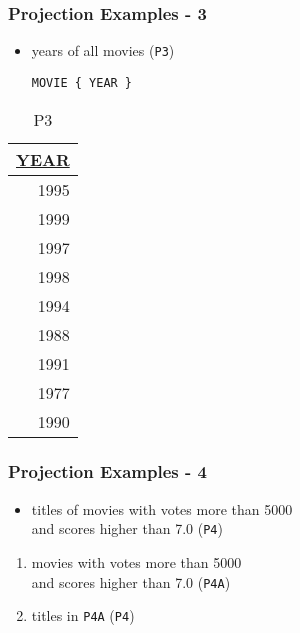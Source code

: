 \documentclass[dvipsnames]{beamer}
\theoremstyle{plain}
\begin{document}
\begin{frame}[fragile]
  \frametitle{Projection Examples - 3}

  \begin{itemize}
    \item years of all movies (\texttt{P3})
    \begin{lstlisting}
MOVIE { YEAR }
    \end{lstlisting}
  \end{itemize}

  \vspace{-10pt}
  \begin{tiny}
  \begin{table}
    \caption{P3}
    \begin{tabular}{|r|}\hline
\underline{YEAR}\\[2pt]\hline\hline
            1995\\\hline
            1999\\\hline
            1997\\\hline
            1998\\\hline
            1994\\\hline
            1988\\\hline
            1991\\\hline
            1977\\\hline
            1990\\\hline
    \end{tabular}
  \end{table}
  \end{tiny}
\end{frame}

\begin{frame}
  \frametitle{Projection Examples - 4}

  \begin{itemize}
    \item titles of movies with votes more than 5000\\
      and scores higher than 7.0 (\texttt{P4})
  \end{itemize}

  \pause
  \begin{enumerate}
    \item movies with votes more than 5000\\
      and scores higher than 7.0 (\texttt{P4A})

    \pause
    \item titles in \texttt{P4A} (\texttt{P4})
  \end{enumerate}
\end{frame}
\end{document}
